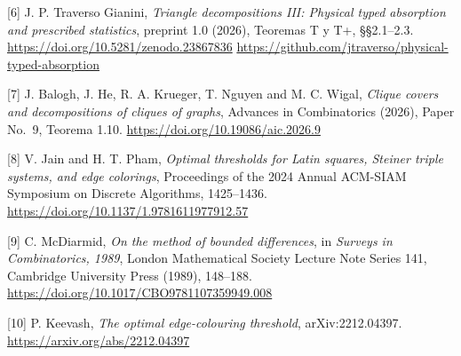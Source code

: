 \documentclass[spanish,11pt,a4paper]{article}
\begin{document}
{[}6{]} J. P. Traverso Gianini, \emph{Triangle decompositions III: Physical typed absorption and prescribed statistics}, preprint 1.0 (2026), Teoremas T y T+, §§2.1--2.3. \url{https://doi.org/10.5281/zenodo.23867836} \url{https://github.com/jtraverso/physical-typed-absorption}

{[}7{]} J. Balogh, J. He, R. A. Krueger, T. Nguyen and M. C. Wigal, \emph{Clique covers and decompositions of cliques of graphs}, Advances in Combinatorics (2026), Paper No.~9, Teorema 1.10. \url{https://doi.org/10.19086/aic.2026.9}

{[}8{]} V. Jain and H. T. Pham, \emph{Optimal thresholds for Latin squares, Steiner triple systems, and edge colorings}, Proceedings of the 2024 Annual ACM-SIAM Symposium on Discrete Algorithms, 1425--1436. \url{https://doi.org/10.1137/1.9781611977912.57}

{[}9{]} C. McDiarmid, \emph{On the method of bounded differences}, in \emph{Surveys in Combinatorics, 1989}, London Mathematical Society Lecture Note Series 141, Cambridge University Press (1989), 148--188. \url{https://doi.org/10.1017/CBO9781107359949.008}

{[}10{]} P. Keevash, \emph{The optimal edge-colouring threshold}, arXiv:2212.04397. \url{https://arxiv.org/abs/2212.04397}
\end{document}
